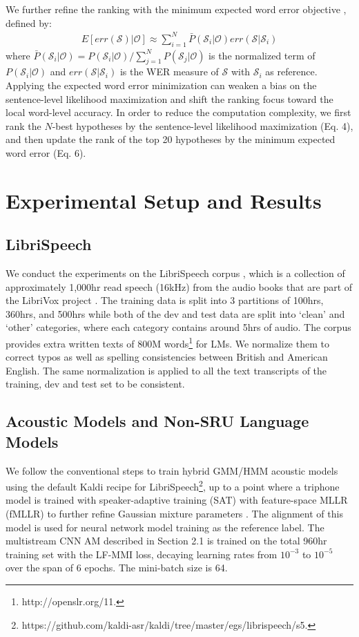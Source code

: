 \documentclass[a4paper]{article}
\begin{document}
We further refine the ranking with the minimum expected word error objective \cite{stolcke1997explicit}, defined by:
\begin{align}
    E[err(\mathcal{S})|\mathcal{O}] \approx \sum_{i=1}^{N}\bar{P}(\mathcal{S}_i|\mathcal{O})err(\mathcal{S}|\mathcal{S}_i)
\end{align}
where $\bar{P}(\mathcal{S}_i|\mathcal{O}) = P(\mathcal{S}_i|\mathcal{O}) / \sum_{j=1}^{N}P(\mathcal{S}_j|\mathcal{O})$ is the normalized term of $P(\mathcal{S}_i|\mathcal{O})$ and $err(\mathcal{S}|\mathcal{S}_i)$ is the WER measure of $\mathcal{S}$ with $\mathcal{S}_i$ as reference. Applying the expected word error minimization can weaken a bias on the sentence-level likelihood maximization and shift the ranking focus toward the local word-level accuracy. In order to reduce the computation complexity, we first rank the $N$-best hypotheses by the sentence-level likelihood maximization (Eq. 4), and then update the rank of the top 20 hypotheses by the minimum expected word error (Eq. 6).


\section{Experimental Setup and Results}



\subsection{LibriSpeech}
We conduct the experiments on the LibriSpeech corpus \cite{panayotov2015librispeech}, which is a collection of approximately 1,000hr read speech (16kHz) from the audio books that are part of the LibriVox project \cite{librivox14}. The training data is split into 3 partitions of 100hrs, 360hrs, and 500hrs while both of the dev and test data are split into `clean’ and `other’ categories, where each category contains around 5hrs of audio. The corpus provides extra written texts of 800M words\footnote{http://openslr.org/11.} for LMs. We normalize them to correct typos as well as spelling consistencies between British and American English. The same normalization is applied to all the text transcripts of the training, dev and test set to be consistent. 


\subsection{Acoustic Models and Non-SRU Language Models}
We follow the conventional steps to train hybrid GMM/HMM acoustic models using the default Kaldi recipe for LibriSpeech\footnote{https://github.com/kaldi-asr/kaldi/tree/master/egs/librispeech/s5.}, up to a point where a triphone model is trained with speaker-adaptive training (SAT) with feature-space MLLR (fMLLR) to further refine Gaussian mixture parameters \cite{Gales97}. The alignment of this model is used for neural network model training as the reference label. The multistream CNN AM described in Section 2.1 is trained on the total 960hr training set with the LF-MMI loss, decaying learning rates from $10^{-3}$ to $10^{-5}$ over the span of 6 epochs. The mini-batch size is 64.  
\end{document}
